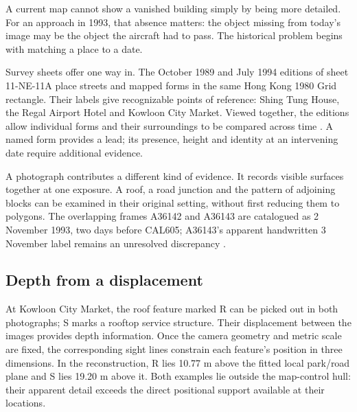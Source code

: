 \label{part:4}
A current map cannot show a vanished building simply by being more detailed. For an approach in 1993, that absence matters: the object missing from today's image may be the object the aircraft had to pass. The historical problem begins with matching a place to a date.

Survey sheets offer one way in. The October 1989 and July 1994 editions of sheet 11-NE-11A place streets and mapped forms in the same Hong Kong 1980 Grid rectangle. Their labels give recognizable points of reference: Shing Tung House, the Regal Airport Hotel and Kowloon City Market. Viewed together, the editions allow individual forms and their surroundings to be compared across time \citep{maps}. A named form provides a lead; its presence, height and identity at an intervening date require additional evidence.


A photograph contributes a different kind of evidence. It records visible surfaces together at one exposure. A roof, a road junction and the pattern of adjoining blocks can be examined in their original setting, without first reducing them to polygons. The overlapping frames A36142 and A36143 are catalogued as 2 November 1993, two days before CAL605; A36143's apparent handwritten 3 November label remains an unresolved discrepancy \citep{photos}.

\subsection*{Depth from a displacement}
At Kowloon City Market, the roof feature marked R can be picked out in both photographs; S marks a rooftop service structure. Their displacement between the images provides depth information. Once the camera geometry and metric scale are fixed, the corresponding sight lines constrain each feature's position in three dimensions. In the reconstruction, R lies 10.77 m above the fitted local park/road plane and S lies 19.20 m above it. Both examples lie outside the map-control hull: their apparent detail exceeds the direct positional support available at their locations.

